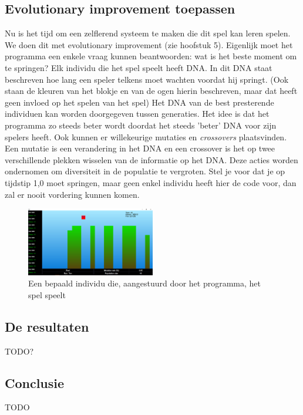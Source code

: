 \documentclass[a4paper,titlepage]{article}
\begin{document}
\subsection{Evolutionary improvement toepassen}
Nu is het tijd om een zelflerend systeem te maken die dit spel kan leren spelen. We doen dit met evolutionary improvement (zie hoofstuk 5). Eigenlijk moet het programma een enkele vraag kunnen beantwoorden: wat is het beste moment om te springen? 
Elk individu die het spel speelt heeft DNA. In dit DNA staat beschreven hoe lang een speler telkens moet wachten voordat hij springt. (Ook staan de kleuren van het blokje en van de ogen hierin beschreven, maar dat heeft geen invloed op het spelen van het spel) Het DNA van de best presterende individuen kan worden doorgegeven tussen generaties. Het idee is dat het programma zo steeds beter wordt doordat het steeds 'beter' DNA voor zijn spelers heeft.
Ook kunnen er willekeurige mutaties en \textit{crossovers} plaatsvinden. Een mutatie is een verandering in het DNA en een crossover is het op twee verschillende plekken wisselen van de informatie op het DNA. Deze acties worden ondernomen om diversiteit in de populatie te vergroten. Stel je voor dat je op tijdstip 1,0 moet springen, maar geen enkel individu heeft hier de code voor, dan zal er nooit vordering kunnen komen.

\begin{figure}[h]
  \centering
    \includegraphics[width=0.5\textwidth]{platformer2.png}
  \caption{Een bepaald individu die, aangestuurd door het programma, het spel speelt}
  \label{fig:platformer1}
\end{figure}

\subsection{De resultaten}
TODO?

\subsection{Conclusie}
TODO
\end{document}
